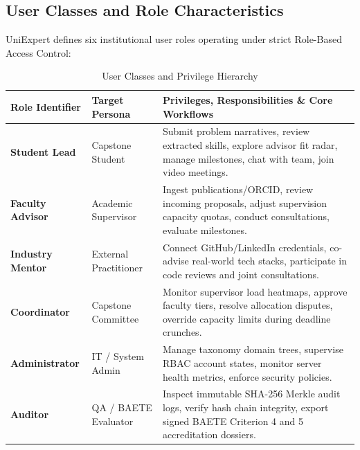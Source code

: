 \documentclass[10.5pt,a4paper]{article}
\begin{document}
\subsection{User Classes and Role Characteristics}
UniExpert defines six institutional user roles operating under strict Role-Based Access Control:

\begin{table}[h]
\centering
\small
\begin{tabularx}{\linewidth}{|l|l|X|}
\hline
\rowcolor{headergray} \textbf{Role Identifier} & \textbf{Target Persona} & \textbf{Privileges, Responsibilities \& Core Workflows} \\ \hline
\textbf{Student Lead} & Capstone Student & Submit problem narratives, review extracted skills, explore advisor fit radar, manage milestones, chat with team, join video meetings. \\ \hline
\textbf{Faculty Advisor} & Academic Supervisor & Ingest publications/ORCID, review incoming proposals, adjust supervision capacity quotas, conduct consultations, evaluate milestones. \\ \hline
\textbf{Industry Mentor} & External Practitioner & Connect GitHub/LinkedIn credentials, co-advise real-world tech stacks, participate in code reviews and joint consultations. \\ \hline
\textbf{Coordinator} & Capstone Committee & Monitor supervisor load heatmaps, approve faculty tiers, resolve allocation disputes, override capacity limits during deadline crunches. \\ \hline
\textbf{Administrator} & IT / System Admin & Manage taxonomy domain trees, supervise RBAC account states, monitor server health metrics, enforce security policies. \\ \hline
\textbf{Auditor} & QA / BAETE Evaluator & Inspect immutable SHA-256 Merkle audit logs, verify hash chain integrity, export signed BAETE Criterion 4 and 5 accreditation dossiers. \\ \hline
\end{tabularx}
\caption{User Classes and Privilege Hierarchy}
\end{table}
\end{document}
